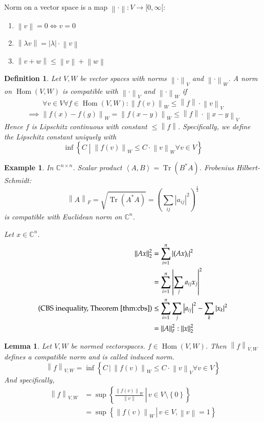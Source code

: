 \documentclass{article}
\newcounter{lecref}[section]
\numberwithin{lecref}{section}
\newtheorem{example}[lecref]{Example}
\newtheorem{definition}[lecref]{Definition}
\newtheorem{lemma}[lecref]{Lemma}
\newcommand{\set}[1]{\left\{#1\right\}}
\newcommand{\setdef}[2]{\left\{\left.#1\,\right|\,#2\right\}}
\newcommand{\angel}[1]{\left\langle#1\right\rangle}
\newcommand{\norm}[1]{\left\|#1\right\|}
\newcommand{\card}[1]{\left|#1\right|}
\begin{document}
Norm on a vector space is a map $\norm{\cdot}: V \to [0, \infty[$:
\begin{enumerate}
  \item $\norm{v} = 0 \iff v = 0$
  \item $\norm{\lambda v} = \card{\lambda} \cdot \norm{v}$
  \item $\norm{v + w} \leq \norm{v} + \norm{w}$
\end{enumerate}

\begin{definition} %
  Let $V, W$ be vector spaces with norms $\norm{\cdot}_V$ and $\norm{\cdot}_W$.
  A norm on $\operatorname{Hom}(V, W)$ is \emph{compatible} with $\norm{\cdot}_V$ and $\norm{\cdot}_W$ if
  \[ \forall v \in V \forall f \in \operatorname{Hom}(V, W): \norm{f(v)}_W \leq \norm{f} \cdot \norm{v}_V \]
  \[ \implies \norm{f(x) - f(g)}_W = \norm{f(x - y)}_W \leq \norm{f} \cdot \norm{x - y}_V \]
  Hence $f$ is Lipschitz continuous with constant $\leq \norm{f}$.
  Specifically, we define the Lipschitz constant uniquely with
  \[ \inf\set{C \middle| \norm{f(v)}_W \leq C \cdot \norm{v}_W \forall v \in V} \]
\end{definition}

\begin{example}
  In $\mathbb C^{n \times n}$. Scalar product $\angel{A, B} = \operatorname{Tr}(B^* A)$.
  Frobenius Hilbert-Schmidt:
  \[ \norm{A}_F = \sqrt{\operatorname{Tr}(A^* A)} = \left(\sum_{ij} \card{a_{ij}}^2\right)^{\frac12} \]
  is compatible with Euclidean norm on $\mathbb C^n$.

  Let $x \in \mathbb C^n$.
  \begin{align*}
    \norm{Ax}_2^2 &= \sum_{i=1}^n \card{(Ax)_i}^2 \\
      &= \sum_{i=1}^n \card{\sum_j a_{ij} x_j}^2 \\
    \text{(CBS inequality, Theorem~\ref{thm:cbs})} &\leq \sum_{i=1}^n \sum_j \card{a_{ij}}^2 - \sum_k \card{x_k}^2 \\
      &= \norm{A}_F^2 : \norm{x}_2^2
  \end{align*}
\end{example}

\begin{lemma} %
  Let $V, W$ be normed vectorspaces. $f \in \operatorname{Hom}(V, W)$.
  Then $\norm{f}_{V, W}$ defines a compatible norm and is called \emph{induced norm}.
  \[ \norm{f}_{V,W} = \inf\setdef{C}{\norm{f(v)}_W \leq C \cdot \norm{v}_V \forall v \in V} \]
  And specifically,
  \begin{align*}
    \norm{f}_{V,W} &= \sup\setdef{\frac{\norm{f(v)}_W}{\norm{v}}}{v \in V \setminus \set{0}} \\
      &= \sup\setdef{\norm{f(v)}_W}{v \in V, \norm{v} = 1} \\
  \end{align*}
\end{lemma}
\end{document}
